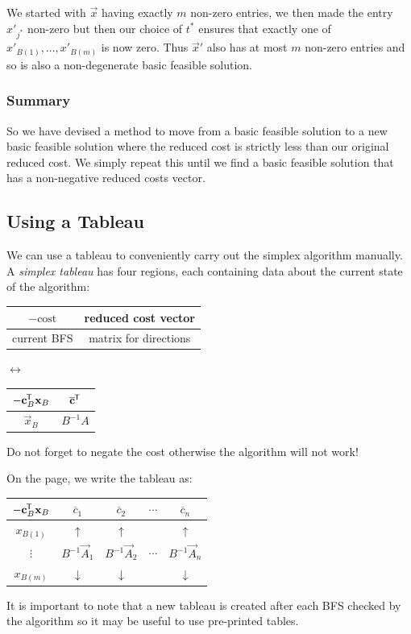 \documentclass[../main.tex]{subfiles}
\begin{document}
We started with $\vec{x}$ having exactly $m$ non-zero entries, we then made the entry $x'_{j^{*}}$ non-zero but then our choice of $t^{*}$ ensures that exactly one of $x'_{B(1)}, \ldots, x'_{B(m)}$ is now zero.
Thus $\vec{x}'$ also has at most $m$ non-zero entries and so is also a non-degenerate basic feasible solution.

\subsubsection{Summary}
So we have devised a method to move from a basic feasible solution to a new basic feasible solution where the reduced cost is strictly less than our original reduced cost.
We simply repeat this until we find a basic feasible solution that has a non-negative reduced costs vector.

\subsection{Using a Tableau}
We can use a tableau to conveniently carry out the simplex algorithm manually.
A \textit{simplex tableau} has four regions, each containing data about the current state of the algorithm:
\begin{center}
\begin{tabular}{|c|c|}
\hline
$-\text{cost}$ & reduced cost vector \\
\hline
current BFS & matrix for directions \\
\hline
\end{tabular}
$\longleftrightarrow$
\begin{tabular}{|c|c|}
\hline
$- \mathbf{\bm{c}}^{{\mkern-1.5mu\mathsf{T}}}_{B} \mathbf{\bm{x}}_{B}$ & $\overline{\mathbf{\bm{c}}}^{{\mkern-1.5mu\mathsf{T}}}$ \\
\hline
$\vec{x}_{B}$ & $B^{-1} A$ \\
\hline
\end{tabular}
\end{center}
\begin{remark}[Warning]
  Do not forget to negate the cost otherwise the algorithm will not work!
\end{remark}
On the page, we write the tableau as:
\begin{center}
\begin{tabular}{|c|c|c|c|c|}
\hline
$-\mathbf{\bm{c}}^{{\mkern-1.5mu\mathsf{T}}}_{B} \mathbf{\bm{x}}_{B}$ & $\overline{c}_1$ & $\overline{c}_2$ & $\cdots$ & $\overline{c}_n$ \\
\hline
$x_{B(1)}$ & $\uparrow$ & $\uparrow$ &  & $\uparrow$ \\
$\vdots$ & $B^{-1}\vec{A}_1$ & $B^{-1} \vec{A}_2$ & $\cdots$ & $B^{-1} \vec{A}_n$ \\
$x_{B(m)}$ & $\downarrow$ & $\downarrow$ &  & $\downarrow$ \\
\hline
\end{tabular}
\end{center}
\begin{remark}[Note]
  It is important to note that a new tableau is created after each BFS checked by the algorithm so it may be useful to use pre-printed tables.
\end{remark}
\end{document}
